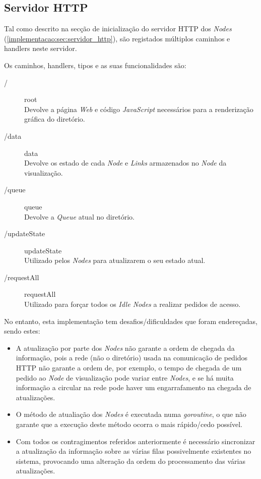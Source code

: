 \subsection*{Servidor \acs{HTTP}}
Tal como descrito na secção de inicialização do servidor \acs{HTTP} dos \emph{Nodes} (\ref{implementacao:sec:servidor_http}), são registados 
múltiplos caminhos e handlers neste servidor.

Os caminhos, handlers, tipos e as suas funcionalidades são:
\begin{description}
\item [/] root  \\ Devolve a página \emph{Web} e código \emph{JavaScript} necessários para a renderização gráfica do diretório.
\item [/data] data \\ Devolve os estado de cada \emph{Node} e \emph{Links} armazenados no \emph{Node} da visualização.
\item [/queue] queue \\ Devolve a \emph{Queue} atual no diretório.
\item [/updateState] updateState \\ Utilizado pelos \emph{Nodes} para atualizarem o seu estado atual.
\item [/requestAll] requestAll \\Utilizado para forçar todos os \emph{Idle Nodes} a realizar pedidos de acesso.
\end{description}

No entanto, esta implementação tem desafios/dificuldades que foram endereçadas, sendo estes:
\begin{itemize}
	\item 
A atualização por parte dos \emph{Nodes} não garante a ordem de chegada da informação, pois a rede (não o diretório) usada
na comunicação de pedidos \acs{HTTP} não garante a ordem de, por exemplo, o tempo de chegada de um pedido ao \emph{Node} de visualização
pode variar entre \emph{Nodes}, e se há muita informação a circular na rede pode haver um engarrafamento na chegada de atualizações.

	\item 
O método de atualiação dos \emph{Nodes} é executada numa \emph{goroutine}, o que não garante que a execução deste método 
ocorra o mais rápido/cedo possível.

	\item 
Com todos os contragimentos referidos anteriormente é necessário sincronizar a atualização da informação sobre as várias filas possivelmente existentes no sistema, provocando uma alteração da ordem do processamento das várias atualizações.

\end{itemize}

